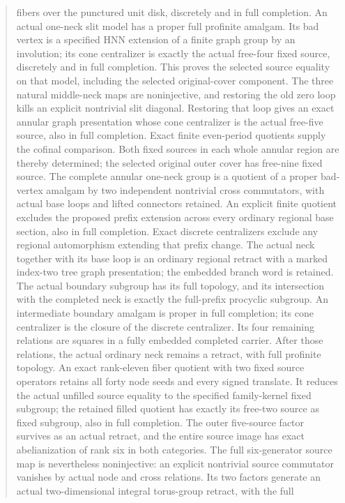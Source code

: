 \documentclass[11pt,a4paper]{article}
\begin{document}
\begin{abstract}
fibers over the punctured unit disk, discretely and in full completion.
An actual one-neck slit model has a proper full profinite amalgam.
Its bad vertex is a specified HNN extension of a finite graph group by
an involution; its cone centralizer is exactly the actual free-four
fixed source, discretely and in full completion. This proves the selected
source equality on that model, including the selected original-cover
component. The three natural middle-neck maps are noninjective, and
restoring the old zero loop kills an explicit nontrivial slit diagonal.
Restoring that loop gives an exact annular graph presentation whose
cone centralizer is the actual free-five source, also in full completion.
Exact finite even-period quotients supply the cofinal comparison. Both
fixed sources in each whole annular region are thereby determined; the
selected original outer cover has free-nine fixed source. The complete
annular one-neck group is a quotient of a proper bad-vertex amalgam by
two independent nontrivial cross commutators, with actual base loops
and lifted connectors retained. An explicit finite quotient excludes the proposed prefix extension
across every ordinary regional base section, also in full completion.
Exact discrete centralizers exclude any regional automorphism extending
that prefix change. The actual neck together with its base loop is an
ordinary regional retract with a marked index-two tree graph presentation;
the embedded branch word is retained. The actual boundary subgroup
has its full topology, and its intersection with the completed neck is
exactly the full-prefix procyclic subgroup. An intermediate boundary
amalgam is proper in full completion; its cone centralizer is the closure
of the discrete centralizer. Its four remaining relations are squares
in a fully embedded completed carrier. After those relations, the actual
ordinary neck remains a retract, with full profinite topology. An exact
rank-eleven fiber quotient with two fixed source operators retains all
forty node seeds and every signed translate. It reduces the actual
unfilled source equality to the specified family-kernel fixed subgroup;
the retained filled quotient has exactly its free-two source as fixed
subgroup, also in full completion. The outer five-source factor survives
as an actual retract, and the entire source image has exact abelianization
of rank six in both categories. The full six-generator source map is
nevertheless noninjective: an explicit nontrivial source commutator
vanishes by actual node and cross relations. Its two factors generate
an actual two-dimensional integral torus-group retract, with the full

\end{abstract}
\end{document}
